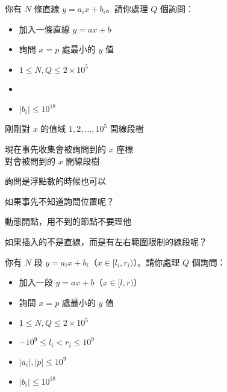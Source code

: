 \begin{frame}{}
    \begin{problem}
        你有 $N$ 條直線 $y = a_i x + b_i$。請你處理 $Q$ 個詢問：

        \begin{itemize}
            \item 加入一條直線 $y = ax + b$
            \item 詢問 $x = p$ 處最小的 $y$ 值
        \end{itemize}

        \begin{itemize}
            \item $1 \le N, Q \le 2 \times 10^5$
            \item {}
            \item $|b_i| \le 10^{18}$
        \end{itemize}
    \end{problem}
\end{frame}

\begin{frame}{}
    剛剛對 $x$ 的值域 $1, 2, \dots, 10^5$ 開線段樹

    現在事先收集會被詢問到的 $x$ 座標 \\
    對會被問到的 $x$ 開線段樹

    詢問是浮點數的時候也可以
\end{frame}

\begin{frame}{}
    如果事先不知道詢問位置呢？

     {
        動態開點，用不到的節點不要理他
    }
\end{frame}

\begin{frame}{}
    如果插入的不是直線，而是有左右範圍限制的線段呢？
    \begin{problem}
        你有 $N$ 段 $y = a_i x + b_i$（$x \in [l_i, r_i)$）。請你處理 $Q$ 個詢問：

        \begin{itemize}
            \item 加入一段 $y = ax + b$（$x \in [l, r)$）
            \item 詢問 $x = p$ 處最小的 $y$ 值
        \end{itemize}

        \begin{itemize}
            \item $1 \le N, Q \le 2 \times 10^5$
            \item $-10^9 \leq l_i < r_i \leq 10^9$
            \item $|a_i|, |p| \le 10^9$
            \item $|b_i| \le 10^{18}$
        \end{itemize}
    \end{problem}
\end{frame}

